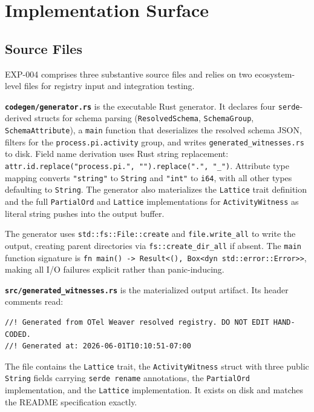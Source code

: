 
\section{Implementation Surface}
\label{sec:otel-weaver-exp-004-registry-to-witness-implementation}

\subsection{Source Files}
\label{sec:otel-weaver-exp-004-registry-to-witness-source-files}

EXP-004 comprises three substantive source files and relies on two ecosystem-level files
for registry input and integration testing.

\textbf{\texttt{codegen/generator.rs}} is the executable Rust generator. It declares four
\texttt{serde}-derived structs for schema parsing (\texttt{ResolvedSchema},
\texttt{SchemaGroup}, \texttt{SchemaAttribute}), a \texttt{main} function that deserializes
the resolved schema JSON, filters for the \texttt{process.pi.activity} group, and writes
\texttt{generated\_witnesses.rs} to disk. Field name derivation uses Rust string replacement:
\texttt{attr.id.replace("process.pi.", "").replace(".", "\_")}. Attribute type mapping
converts \texttt{"string"} to \texttt{String} and \texttt{"int"} to \texttt{i64}, with
all other types defaulting to \texttt{String}. The generator also materializes the
\texttt{Lattice} trait definition and the full \texttt{PartialOrd} and \texttt{Lattice}
implementations for \texttt{ActivityWitness} as literal string pushes into the output
buffer.

The generator uses \texttt{std::fs::File::create} and \texttt{file.write\_all} to write
the output, creating parent directories via \texttt{fs::create\_dir\_all} if absent. The
\texttt{main} function signature is \texttt{fn main() -> Result<(), Box<dyn std::error::Error>>},
making all I/O failures explicit rather than panic-inducing.

\textbf{\texttt{src/generated\_witnesses.rs}} is the materialized output artifact. Its
header comments read:
\begin{verbatim}
//! Generated from OTel Weaver resolved registry. DO NOT EDIT HAND-CODED.
//! Generated at: 2026-06-01T10:10:51-07:00
\end{verbatim}
The file contains the \texttt{Lattice} trait, the \texttt{ActivityWitness} struct with
three public \texttt{String} fields carrying \texttt{serde rename} annotations, the
\texttt{PartialOrd} implementation, and the \texttt{Lattice} implementation. It exists on
disk and matches the README specification exactly.

